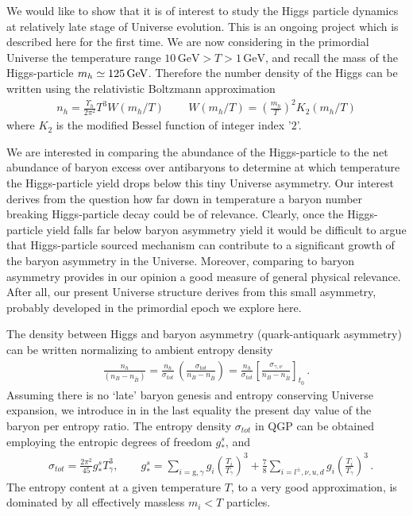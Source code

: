 We would like to show that it is of interest to study the Higgs particle dynamics at relatively late stage of Universe evolution. This is an ongoing project which is described here for the first time. We are now considering in the primordial Universe the temperature range $10\,\mathrm{GeV}>T>1\,\mathrm{GeV}$, and recall the mass of the Higgs-particle $m_h\simeq 125\text{\,GeV}$. Therefore the number density of the Higgs can be written using the relativistic Boltzmann approximation
\begin{align}\label{DensityH}
n_{h}=\frac{\Upsilon_h}{2\pi^2}T^3W(m_h/T)\,\qquad W(m_h/T)=\left(\frac{m_h}{T}\right)^2 K_2(m_h/T)
\end{align}
where $K_2$ is the modified Bessel function of integer index '$2$'.

We are interested in comparing the abundance of the Higgs-particle to the net abundance of baryon excess over antibaryons to determine at which temperature the Higgs-particle yield drops below this tiny Universe asymmetry. Our interest derives from the question how far down in temperature a baryon number breaking Higgs-particle decay could be of relevance. Clearly, once the Higgs-particle yield falls far below baryon asymmetry yield it would be difficult to argue that Higgs-particle sourced mechanism can contribute to a significant growth of the baryon asymmetry in the Universe. Moreover, comparing to baryon asymmetry provides in our opinion a good measure of general physical relevance. After all, our present Universe structure derives from this small asymmetry, probably developed in the primordial epoch we explore here. 
 
The density between Higgs and baryon asymmetry (quark-antiquark asymmetry) can be written normalizing to ambient entropy density
\begin{align}
\frac{n_h}{(n_B-n_{\bar{B}})}=\frac{n_{h}}{\sigma_{tot}}\,\left(\frac{\sigma_{tot}}{n_B-n_{\bar{B}}}\right)=
\frac{n_{h}}{\sigma_{tot}}\left[\frac{\sigma_{\gamma,\nu}}{n_B-n_{\bar{B}}}\right]_{t_0}\,.
\end{align}
Assuming there is no `late' baryon genesis and entropy conserving Universe expansion, we introduce in  in the last equality the present day value of the baryon per entropy ratio. The entropy density $\sigma_{tot}$ in QGP can be obtained employing the entropic degrees of freedom $g^s_\ast$,  and~
\begin{align}
 &\sigma_{tot}=\frac{2\pi^2}{45}g^s_\ast T_\gamma^3,\qquad g^s_\ast=\sum_{i=\mathrm{g},\gamma}g_i\left({\frac{T_i}{T_\gamma}}\right)^3+\frac{7}{8}\sum_{i=l^\pm,\nu,u,d}g_i\left({\frac{T_i}{T_\gamma}}\right)^3\,.
\end{align}
The entropy content at a given temperature $T$, to a very good approximation, is dominated by all effectively massless $m_i<T$ particles. 

